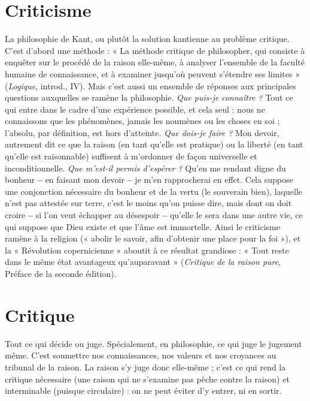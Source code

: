 \section{Criticisme}
La philosophie de Kant, ou plutôt la solution kantienne au
problème critique. C’est d’abord une méthode : « La méthode
critique de philosopher, qui consiste à enquêter sur le procédé de la raison elle-même,
à analyser l’ensemble de la faculté humaine de connaissance, et à examiner
jusqu'où peuvent s'étendre ses limites » ({\it Logique}, introd., IV). Mais c’est
aussi un ensemble de réponses aux principales questions auxquelles se ramène
la philosophie. {\it Que puis-je connaître ?} Tout ce qui entre dans le cadre d’une
expérience possible, et cela seul : nous ne connaissons que les phénomènes,
jamais les noumènes ou les choses en soi ; l'absolu, par définition, est hors
d'atteinte. {\it Que dois-je faire ?} Mon devoir, autrement dit ce que la raison (en
tant qu’elle est pratique) ou la liberté (en tant qu’elle est raisonnable) suffisent
à m'ordonner de façon universelle et inconditionnelle. {\it Que m'est-il permis
d'espérer ?} Qu’en me rendant digne du bonheur {\bf --} en faisant mon devoir {\bf --} je
m'en rapprocherai en effet. Cela suppose une conjonction nécessaire du bonheur
et de la vertu (le souverain bien), laquelle n’est pas attestée sur terre, c’est
le moins qu’on puisse dire, mais dont on doit croire {\bf --} si l’on veut échapper au
désespoir {\bf --} qu’elle le sera dans une autre vie, ce qui suppose que Dieu existe et
que l’âme est immortelle. Ainsi le criticisme ramène à la religion (« abolir le
savoir, afin d'obtenir une place pour la foi »), et la « Révolution
copernicienne » aboutit à ce résultat grandiose : « Tout reste dans le même état
avantageux qu'auparavant » ({\it Critique de la raison pure}, Préface de la seconde
édition).

\section{Critique}
Tout ce qui décide ou juge. Spécialement, en philosophie, ce
qui juge le jugement même. C’est soumettre nos connaissances,
nos valeurs et nos croyances au tribunal de la raison. La raison s’y juge
donc elle-même ; c’est ce qui rend la critique nécessaire (une raison qui ne
s’examine pas pèche contre la raison) et interminable (puisque circulaire) : on
ne peut éviter d’y entrer, ni en sortir.

